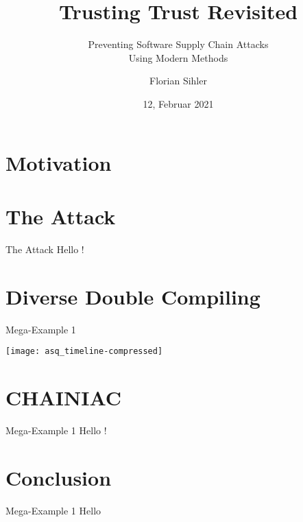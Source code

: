 \documentclass[aspectratio=169,usepdftitle=true]{beamer}
\title{Trusting Trust Revisited}
\subtitle{Preventing Software Supply Chain Attacks\hfill\\Using Modern Methods}
\institute{Institute of Distributed Systems, Ulm University}
\date{12, Februar 2021}
\author{Florian Sihler}
\begin{document}
\section{Motivation}

\def\typesetBox#1#2#3#4{%
    \pbox{7cm}{{\Large\sbfamily#1}\rlap{\textsuperscript{\color{gray}\cite{#4}}}\\\color{gray}#2\hfill#3}%
}

\begin{frame}{\space}
    \begin{layout-imageonly}
\end{layout-imageonly}
\end{frame}

\section{The Attack}
\begin{frame}{The Attack}
    Hello \citeauthor{Thompson1984} \cite{Thompson1984}!
\end{frame}

\section{Diverse Double Compiling}

\begin{frame}{Mega-Example 1}
    \begin{layout-imageonly}
        \texttt{[image: asq\_timeline-compressed]}
    \end{layout-imageonly}
\end{frame}

\section{CHAINIAC}

\begin{frame}{Mega-Example 1}
    Hello \cite{Nikitin2017}!
\end{frame}


\section{Conclusion}

\begin{frame}{Mega-Example 1}
    Hello
\end{frame}


%
\end{document}
